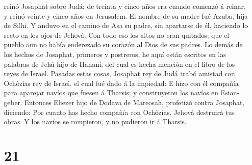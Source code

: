 reinó Josaphat sobre Judá: de treinta y cinco años era cuando comenzó á
reinar, y reinó veinte y cinco años en Jerusalem. El nombre de su madre
fué Azuba, hija de Silhi.  Y anduvo en el camino de Asa su
padre, sin apartarse de él, haciendo lo recto en los ojos de Jehová.
 Con todo eso los altos no eran quitados; que el pueblo aun
no había enderezado su corazón al Dios de sus padres.  Lo
demás de los hechos de Josaphat, primeros y postreros, he aquí están
escritos en las palabras de Jehú hijo de Hanani, del cual es hecha
mención en el libro de los reyes de Israel.  Pasadas estas
cosas, Josaphat rey de Judá trabó amistad con Ochôzías rey de Israel, el
cual fué dado á la impiedad:  E hizo con él compañía para
aparejar navíos que fuesen á Tharsis; y construyeron los navíos en
Esion-geber.  Entonces Eliezer hijo de Dodava de Mareosah,
profetizó contra Josaphat, diciendo: Por cuanto has hecho compañía con
Ochôzías, Jehová destruirá tus obras. Y los navíos se rompieron, y no
pudieron ir á Tharsis.

\hypertarget{section-20}{%
\section{21}\label{section-20}}

